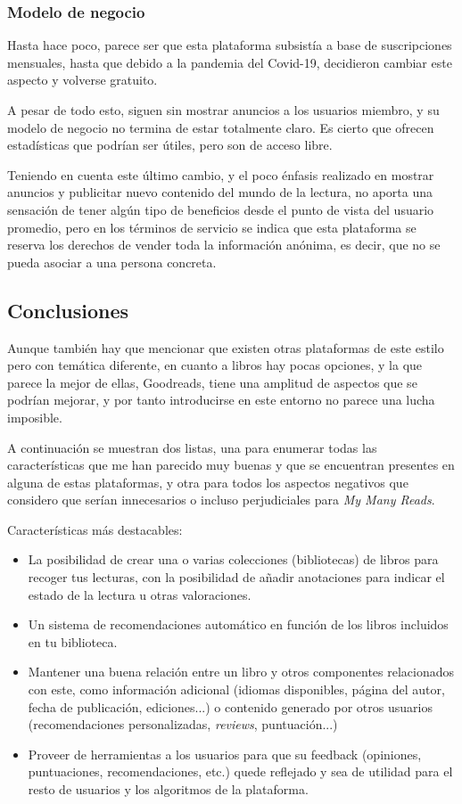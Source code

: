\subsubsection{Modelo de negocio}

Hasta hace poco, parece ser que esta plataforma subsistía a base de suscripciones mensuales, hasta que debido a la pandemia del Covid-19, decidieron cambiar este aspecto y volverse gratuito.

A pesar de todo esto, siguen sin mostrar anuncios a los usuarios miembro, y su modelo de negocio no termina de estar totalmente claro. Es cierto que ofrecen estadísticas que podrían ser útiles, pero son de acceso libre. 

Teniendo en cuenta este último cambio, y el poco énfasis realizado en mostrar anuncios y publicitar nuevo contenido del mundo de la lectura, no aporta una sensación de tener algún tipo de beneficios desde el punto de vista del usuario promedio, pero en los términos de servicio se indica que esta plataforma se reserva los derechos de vender toda la información anónima, es decir, que no se pueda asociar a una persona concreta.
 
\subsection{Conclusiones}

Aunque también hay que mencionar que existen otras plataformas de este estilo pero con temática diferente, en cuanto a libros hay pocas opciones, y la que parece la mejor de ellas, Goodreads, tiene una amplitud de aspectos que se podrían mejorar, y por tanto introducirse en este entorno no parece una lucha imposible.

A continuación se muestran dos listas, una para enumerar todas las características que me han parecido muy buenas y que se encuentran presentes en alguna de estas plataformas, y otra para todos los aspectos negativos que considero que serían innecesarios o incluso perjudiciales para \textit{My Many Reads}.

Características más destacables:

\begin{itemize}
\item La posibilidad de crear una o varias colecciones (bibliotecas) de libros para recoger tus lecturas, con la posibilidad de añadir anotaciones para indicar el estado de la lectura u otras valoraciones.
\item Un sistema de recomendaciones automático en función de los libros incluidos en tu biblioteca.
\item Mantener una buena relación entre un libro y otros componentes relacionados con este, como información adicional (idiomas disponibles, página del autor, fecha de publicación, ediciones...) o contenido generado por otros usuarios (recomendaciones personalizadas, \textit{reviews}, puntuación...)
\item Proveer de herramientas a los usuarios para que su feedback (opiniones, puntuaciones, recomendaciones, etc.) quede reflejado y sea de utilidad para el resto de usuarios y los algoritmos de la plataforma.
\end{itemize}

